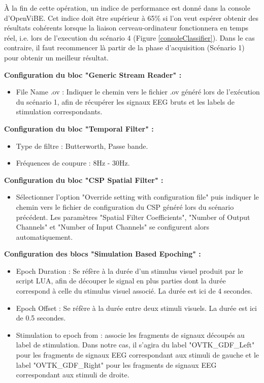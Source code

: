 À la fin de cette opération, un indice de performance est donné dans la console d'OpenViBE. Cet indice doit être supérieur à 65\% si l'on veut espérer obtenir des résultats cohérents lorsque la liaison cerveau-ordinateur fonctionnera en temps réel, i.e. lors de l'execution du scénario 4 (Figure \ref{consoleClassifier}). Dans le cas contraire, il faut recommencer là partir de la phase d'acquisition (Scénario 1) pour obtenir un meilleur résultat.

\smallbreak
\textbf{Configuration du bloc "Generic Stream Reader" : }
\smallbreak
\begin{itemize}
	\item File Name .ov : Indiquer le chemin vers le fichier .ov généré lors de l'exécution du scénario 1, afin de récupérer les signaux EEG bruts et les labels de stimulation correspondants.
	\smallbreak
\end{itemize}

\smallbreak
\textbf{Configuration du bloc "Temporal Filter" : }
\smallbreak
\begin{itemize}
	\item Type de filtre : Butterworth, Passe bande.
	\smallbreak
	\item Fréquences de coupure : 8Hz - 30Hz.
\end{itemize}

\smallbreak
\textbf{Configuration du bloc "CSP Spatial Filter" : }
\smallbreak
\begin{itemize}
	\item Sélectionner l'option "Override setting with configuration file" puis indiquer le chemin vers le fichier de configuration du CSP généré lors du scénario précédent. Les paramètres "Spatial Filter Coefficients", "Number of Output Channels" et "Number of Input Channels" se configurent alors automatiquement. 
\end{itemize}

\smallbreak
\textbf{Configuration des blocs "Simulation Based Epoching" : }
\smallbreak
\begin{itemize}
	\item Epoch Duration : Se réfère à la durée d'un stimulus visuel produit par le script LUA, afin de découper le signal en plus parties dont la durée correspond à celle du stimulus visuel associé. La durée est ici de 4 secondes.
	\smallbreak
	\item Epoch Offset : Se réfère à la durée entre deux stimuli visuels. La durée est ici de 0.5 secondes.
	\smallbreak
	\item Stimulation to epoch from : associe les fragments de signaux découpés au label de stimulation. Dans notre cas, il s'agira du label "OVTK\_GDF\_Left" pour les fragments de signaux EEG correspondant aux stimuli de gauche et le label "OVTK\_GDF\_Right" pour les fragments de signaux EEG correspondant aux stimuli de droite.
\end{itemize}

